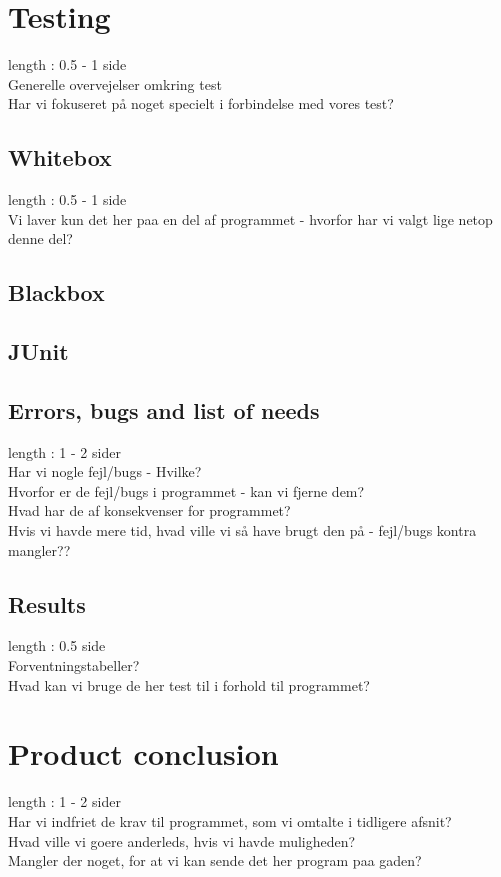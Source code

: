 \documentclass[a4paper,10pt,titlepage]{article}
\begin{document}
	\section{Testing}
		length : 0.5 - 1 side\\
		Generelle overvejelser omkring test\\
		Har vi fokuseret på noget specielt i forbindelse med vores test?\\
		
		\subsection{Whitebox}
			length : 0.5 - 1 side\\
			Vi laver kun det her paa en del af programmet - hvorfor har vi valgt lige netop denne del?\\
			
		\subsection{Blackbox}
			
		\subsection{JUnit}
			
		\subsection{Errors, bugs and list of needs}
			length : 1 - 2 sider\\
			Har vi nogle fejl/bugs - Hvilke?\\
			Hvorfor er de fejl/bugs i programmet - kan vi fjerne dem?\\
			Hvad har de af konsekvenser for programmet?\\
			Hvis vi havde mere tid, hvad ville vi så have brugt den på - fejl/bugs kontra mangler??\\
			
		\subsection{Results}
			length : 0.5 side\\
			Forventningstabeller?\\
			Hvad kan vi bruge de her test til i forhold til programmet?\\
			
	\section{Product conclusion}
		length : 1 - 2 sider\\
		Har vi indfriet de krav til programmet, som vi omtalte i tidligere afsnit?\\
		Hvad ville vi goere anderleds, hvis vi havde muligheden?\\
		Mangler der noget, for at vi kan sende det her program paa gaden?\\
		
\end{document}
